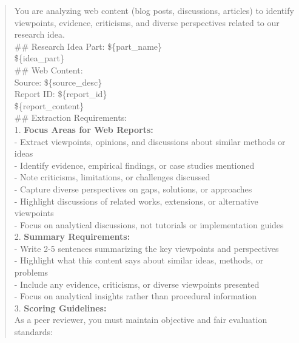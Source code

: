\begin{quote}
\begin{tcolorbox}[breakable,colback=grounding!20!white, colframe=grounding!60!black, title=\textbf{Prompt for Grounding Agent - Web}]
        You are analyzing web content (blog posts, discussions, articles) to identify viewpoints, evidence, criticisms, and diverse perspectives related to our research idea.\\

        \#\# Research Idea Part: \$\{part\_name\}\\

        \$\{idea\_part\}\\

        \#\# Web Content:\\
        Source: \$\{source\_desc\}\\
        Report ID: \$\{report\_id\}\\

        \$\{report\_content\}\\

        \#\# Extraction Requirements:\\

        1. \textbf{Focus Areas for Web Reports:}\\
        - Extract viewpoints, opinions, and discussions about similar methods or ideas\\
        - Identify evidence, empirical findings, or case studies mentioned\\
        - Note criticisms, limitations, or challenges discussed\\
        - Capture diverse perspectives on gaps, solutions, or approaches\\
        - Highlight discussions of related works, extensions, or alternative viewpoints\\
        - Focus on analytical discussions, not tutorials or implementation guides\\

        2. \textbf{Summary Requirements:}\\
        - Write 2-5 sentences summarizing the key viewpoints and perspectives\\
        - Highlight what this content says about similar ideas, methods, or problems\\
        - Include any evidence, criticisms, or diverse viewpoints presented\\
        - Focus on analytical insights rather than procedural information\\

        3. \textbf{Scoring Guidelines:}\\
        As a peer reviewer, you must maintain objective and fair evaluation standards:\\
   

\end{tcolorbox}
\end{quote}
